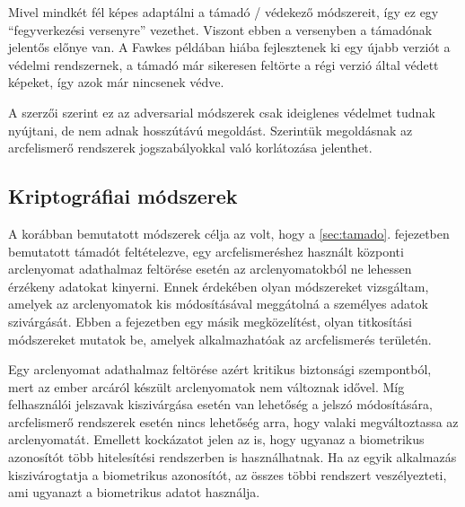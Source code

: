 Mivel mindkét fél képes adaptálni a támadó / védekező módszereit, így ez egy ``fegyverkezési versenyre'' vezethet. Viszont ebben a versenyben a támadónak jelentős előnye van. A Fawkes példában hiába fejlesztenek ki egy újabb verziót a védelmi rendszernek, a támadó már sikeresen feltörte a régi verzió által védett képeket, így azok már nincsenek védve.

A \cite{radiya2021data} szerzői szerint ez az adversarial módszerek csak ideiglenes védelmet tudnak nyújtani, de nem adnak hosszútávú megoldást. Szerintük megoldásnak az arcfelismerő rendszerek jogszabályokkal való korlátozása jelenthet. 

\subsection{Kriptográfiai módszerek}


A korábban bemutatott módszerek célja az volt, hogy a \ref{sec:tamado}. fejezetben bemutatott támadót feltételezve, egy arcfelismeréshez használt központi arclenyomat adathalmaz feltörése esetén az arclenyomatokból ne lehessen érzékeny adatokat kinyerni. Ennek érdekében olyan módszereket vizsgáltam, amelyek az arclenyomatok kis módosításával meggátolná a személyes adatok szivárgását. Ebben a fejezetben egy másik megközelítést, olyan titkosítási módszereket mutatok be, amelyek alkalmazhatóak az arcfelismerés területén.

Egy arclenyomat adathalmaz feltörése azért kritikus biztonsági szempontból, mert az ember arcáról készült arclenyomatok nem változnak idővel. Míg felhasználói jelszavak kiszivárgása esetén van lehetőség a jelszó módosítására, arcfelismerő rendszerek esetén nincs lehetőség arra, hogy valaki megváltoztassa az arclenyomatát. Emellett kockázatot jelen az is, hogy ugyanaz a biometrikus azonosítót több hitelesítési rendszerben is használhatnak. Ha az egyik alkalmazás kiszivárogtatja a biometrikus azonosítót, az összes többi rendszert veszélyezteti, ami ugyanazt a biometrikus adatot használja.

